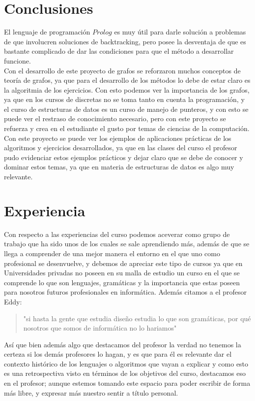 \documentclass[10pt,a4paper]{article}
\begin{document}
\section{Conclusiones}
El lenguaje de programación $Prolog$ es muy útil para darle solución a problemas de que involucren soluciones de backtracking, pero posee la desventaja de que es bastante complicado de dar las condiciones para que el método a desarrollar funcione.\\

Con el desarrollo de este proyecto de grafos se reforzaron muchos conceptos de teoría de grafos, ya que para el desarrollo de los métodos lo debe de estar claro es la algoritmia de los ejercicios. Con esto podemos ver la importancia de los grafos, ya que en los cursos de discretas no se toma tanto en cuenta la programación, y el curso de estructuras de datos es un curso de manejo de punteros, y con esto se puede ver el restraso de conocimiento necesario, pero con este proyecto se refuerza y crea en el estudiante el gusto por temas de ciencias de la computación.\\

Con este proyecto se puede ver los ejemplos de aplicaciones prácticas de los algoritmos y ejercicios desarrollados, ya que en las clases del curso el profesor pudo evidenciar estos ejemplos prácticos y dejar claro que se debe de conocer y dominar estos temas, ya que en materia de estructuras de datos es algo muy relevante.\\
\section{Experiencia}
Con respecto a las experiencias del curso podemos aceverar como grupo de trabajo que ha sido unos de los cuales se sale aprendiendo más, además de que se llega a comprender de una mejor manera el entorno en el que uno como profesional se desenvuelve, y debemos de apreciar este tipo de cursos ya que en Universidades privadas no poseen en su malla de estudio un curso en el que se comprende lo que son lenguajes, gramáticas y la importancia que estas poseen para nosotros futuros profesionales en informática. Además citamos a el profesor Eddy:
\begin{quote}
"si hasta la gente que estudia diseño estudia lo que son gramáticas, por qué nosotros que somos de informática no lo hariamos" 
\end{quote} 

Así que bien además algo que destacamos del profesor la verdad no tenemos la certeza si los demás profesores lo hagan, y es que para él es relevante dar el contexto histórico de los lenguajes o algoritmos que vayan a explicar y como esto es una retrospectiva visto en términos de los objetivos del curso, destacamos eso en el profesor; aunque estemos tomando este espacio para poder escribir de forma más libre, y expresar más nuestro sentir a título personal.\\ 
\end{document}
